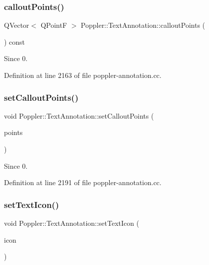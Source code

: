 \subsubsection{\texorpdfstring{callout\+Points()}{calloutPoints()}}
{\footnotesize\ttfamily Q\+Vector$<$ Q\+PointF $>$ Poppler\+::\+Text\+Annotation\+::callout\+Points (\begin{DoxyParamCaption}{ }\end{DoxyParamCaption}) const}

\begin{DoxySince}{Since}
0. 
\end{DoxySince}


Definition at line 2163 of file poppler-\/annotation.\+cc.

\mbox{\label{class_poppler_1_1_text_annotation_a4473ce56c0aedaada08d3eeabf07ec9c}} 
\subsubsection{\texorpdfstring{set\+Callout\+Points()}{setCalloutPoints()}}
{\footnotesize\ttfamily void Poppler\+::\+Text\+Annotation\+::set\+Callout\+Points (\begin{DoxyParamCaption}\item[{const Q\+Vector$<$ Q\+PointF $>$ \&}]{points }\end{DoxyParamCaption})}

\begin{DoxySince}{Since}
0. 
\end{DoxySince}


Definition at line 2191 of file poppler-\/annotation.\+cc.

\mbox{\label{class_poppler_1_1_text_annotation_a6dd7e7857f5ef306d4f0829b7abfa4f4}} 
\subsubsection{\texorpdfstring{set\+Text\+Icon()}{setTextIcon()}}
{\footnotesize\ttfamily void Poppler\+::\+Text\+Annotation\+::set\+Text\+Icon (\begin{DoxyParamCaption}\item[{const Q\+String \&}]{icon }\end{DoxyParamCaption})}

